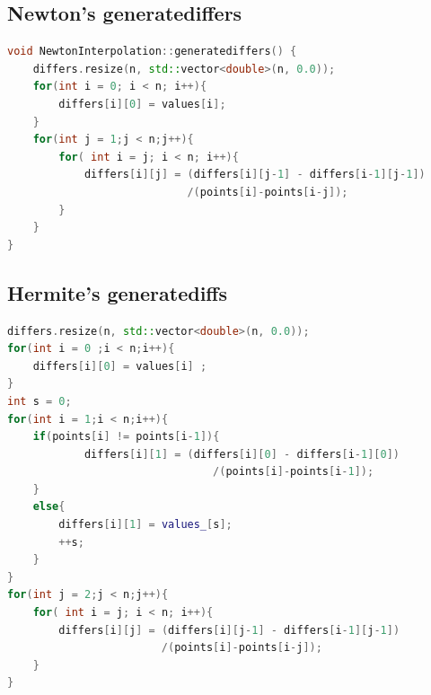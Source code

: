\documentclass[UTF8]{ctexart}
\begin{document}
\subsection{Newton's generatediffers}
\begin{lstlisting}[language=C++]
void NewtonInterpolation::generatediffers() {
    differs.resize(n, std::vector<double>(n, 0.0));
    for(int i = 0; i < n; i++){
        differs[i][0] = values[i];
    }
    for(int j = 1;j < n;j++){
        for( int i = j; i < n; i++){
            differs[i][j] = (differs[i][j-1] - differs[i-1][j-1])
                            /(points[i]-points[i-j]);
        }
    }
}
\end{lstlisting}

\subsection{Hermite's generatediffs}
\begin{lstlisting}[language=C++]
differs.resize(n, std::vector<double>(n, 0.0));
for(int i = 0 ;i < n;i++){
    differs[i][0] = values[i] ;
}
int s = 0;
for(int i = 1;i < n;i++){
    if(points[i] != points[i-1]){
            differs[i][1] = (differs[i][0] - differs[i-1][0])
                                /(points[i]-points[i-1]);
    }
    else{
        differs[i][1] = values_[s]; 
        ++s;
    }
}
for(int j = 2;j < n;j++){
    for( int i = j; i < n; i++){
        differs[i][j] = (differs[i][j-1] - differs[i-1][j-1])
                        /(points[i]-points[i-j]);
    }
}
\end{lstlisting}
\end{document}
